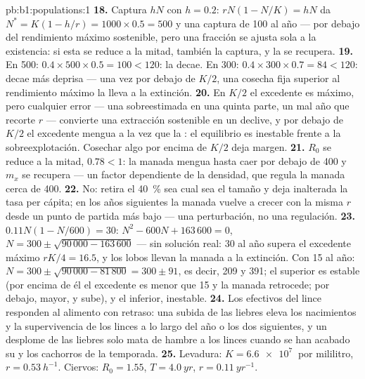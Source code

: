 \begin{solution}{pb:b1:populations:1}
\textbf{18.} Captura $hN$ con $h = 0.2$: $rN(1 - N/K) = hN$ da $N^* =
K(1 - h/r) = 1000\times 0.5 = 500$ y una captura de \num{100} al año ---
por debajo del rendimiento máximo sostenible, pero una fracción se ajusta
sola a la existencia: si esta se reduce a la mitad, también la captura, y la
 se recupera.
\textbf{19.} En 500: $0.4\times 500\times 0.5 = 100 < 120$: la 
decae. En 300: $0.4\times 300\times 0.7 = 84 < 120$: decae más deprisa ---
una vez por debajo de $K/2$, una cosecha fija superior al rendimiento máximo
la lleva a la extinción.
\textbf{20.} En $K/2$ el excedente es máximo, pero cualquier error ---
una  sobreestimada en una quinta parte, un mal año que recorte $r$
--- convierte una extracción sostenible en un declive, y por debajo de $K/2$
el excedente mengua a la vez que la : el equilibrio es inestable
frente a la sobreexplotación. Cosechar algo por encima de $K/2$ deja margen.
\textbf{21.} $R_0$ se reduce a la mitad, $0.78 < 1$: la manada mengua hasta
caer por debajo de 400 y $m_x$ se recupera --- un factor dependiente de la
densidad, que regula la manada cerca de 400.
\textbf{22.} No: retira el \qty{40}{\%} sea cual sea el tamaño y deja
inalterada la tasa per cápita; en los años siguientes la manada vuelve a
crecer con la misma $r$ desde un punto de partida más bajo --- una
perturbación, no una regulación.
\textbf{23.} $0.11N(1 - N/600) = 30$: $N^2 - 600N + 163\,600 = 0$,
$N = 300\pm\sqrt{90\,000 - 163\,600}$ --- sin solución real: 30 al año
supera el excedente máximo $rK/4 = 16.5$, y los lobos llevan la manada a la
extinción. Con 15 al año: $N = 300\pm\sqrt{90\,000 -
81\,800} = 300\pm 91$, es decir, 209 y 391; el superior es estable
(por encima de él el excedente es menor que 15 y la manada retrocede; por
debajo, mayor, y sube), y el inferior, inestable.
\textbf{24.} Los efectivos del lince responden al alimento con retraso: una
subida de las liebres eleva los nacimientos y la supervivencia de los linces
a lo largo del año o los dos siguientes, y un desplome de las liebres solo
mata de hambre a los linces cuando se han acabado su  y los cachorros
de la temporada.
\textbf{25.} Levadura: $K = \qty{6.6e7}{}$  por mililitro, $r =
\qty{0.53}{h^{-1}}$. Ciervos: $R_0 = 1.55$, $T = \qty{4.0}{yr}$, $r =
\qty{0.11}{yr^{-1}}$.
\end{solution}
